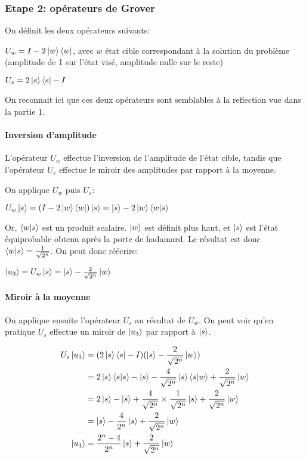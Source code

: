 \subsubsection*{Etape 2: opérateurs de Grover}

On définit les deux opérateurs suivants:

$U_w = I - 2\ket{w}\bra{w}$, avec $w$ état cible correspondant à la solution du problème (amplitude de 1 sur l'état visé, amplitude nulle sur le reste)

$U_s = 2\ket{s}\bra{s} - I$

\begin{rem}
  On reconnait ici que ces deux opérateurs sont semblables à la reflection vue dans la partie 1.
\end{rem}

\paragraph*{Inversion d'amplitude}

L'opérateur $U_w$ effectue l'inversion de l'amplitude de l'état cible, tandis que l'opérateur $U_s$ effectue le miroir des amplitudes par rapport à la moyenne.

On applique $U_w$ puis $U_s$:

$U_w \ket{s} = (I - 2 \ket{w}\bra{w})\ket{s} \nonumber = \ket{s} - 2 \ket{w}\braket{w|s}$

Or, $\braket{w|s}$ est un produit scalaire. $\ket{w}$ est définit plus haut, et $\ket{s}$ est l'état équiprobable obtenu après la porte de hadamard. Le résultat est donc $\braket{w|s} = \frac{1}{\sqrt{2^n}}$. On peut donc réécrire:

$\ket{u_3} = U_w \ket{s} = \ket{s} - \frac{2}{\sqrt{2^n}}\ket{w}$

\paragraph*{Miroir à la moyenne}
On applique ensuite l'opérateur $U_s$ au résultat de $U_w$. On peut voir qu'en pratique $U_s$ effectue un miroir de $\ket{u_3}$ par rapport à $\ket{s}$.

\begin{align}
  U_s\ket{u_3} 
  &= (2\ket{s}\bra{s} - I)(\ket{s} - \frac{2}{\sqrt{2^n}}\ket{w}) \nonumber \\
  &= 2\ket{s}\braket{s|s} - \ket{s} - \frac{4}{\sqrt{2^n}} \ket{s} \braket{s|w} + \frac{2}{\sqrt{2^n}}\ket{w} \nonumber \\
  &= 2\ket{s} - \ket{s} + \frac{4}{\sqrt{2^n}} \times \frac{1}{\sqrt{2^n}} \ket{s} + \frac{2}{\sqrt{2^n}}\ket{w} \nonumber \\
  &= \ket{s} - \frac{4}{2^n} \ket{s} + \frac{2}{\sqrt{2^n}}\ket{w} \nonumber \\
  \ket{u_4}&=\frac{2^n - 4}{2^n}\ket{s} + \frac{2}{\sqrt{2^n}}\ket{w}
\end{align}
